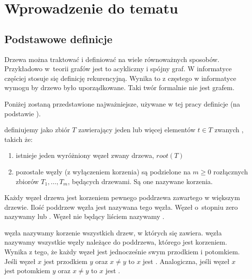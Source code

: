 \chapter{Wprowadzenie do tematu}



\section{Podstawowe definicje}

Drzewa można traktować i definiować na wiele równoważnych sposobów.
Przykładowo w~teorii grafów jest to acykliczny i spójny graf.
W informatyce częściej stosuje się definicję rekurencyjną.
Wynika to z częstego w informatyce wymogu by drzewo było uporządkowane.
Taki twór formalnie nie jest grafem.


Poniżej zostaną przedstawione najważniejsze, używane w tej pracy definicje (na podstawie \cite{knuth}).


  definiujemy jako zbiór $T$ zawierający jeden lub więcej elementów $t \in T$ zwanych  , takich że:

\begin{enumerate}
 \item
    istnieje jeden wyróżniony węzeł zwany  drzewa, $root(T)$
 \item
    pozostałe węzły (z wyłączeniem korzenia) są podzielone na $m \geq 0$ rozłącznych zbiorów $T_{1},\ldots, T_{m}$,
	będących drzewami. Są one nazywane   korzenia.
\end{enumerate}

Każdy węzeł drzewa jest korzeniem pewnego poddrzewa zawartego w większym drzewie.
Ilość poddrzew węzła jest nazywana   tego węzła.
Węzeł o~stopniu zero nazywamy   lub  . 
Węzeł nie będący liściem nazywamy  .



  węzła  nazywamy korzenie wszystkich drzew, w których się zawiera.
  węzła  nazywamy wszystkie węzły należące do poddrzewa, którego jest korzeniem. 
Wynika z tego, że każdy węzeł jest jednocześnie swym przodkiem i potomkiem.
Jeśli węzeł $x$ jest przodkiem $y$ oraz $x \neq y$ to $x$ jest .
Analogiczna, jeśli węzeł $x$ jest potomkiem $y$ oraz $x \neq y$ to $x$ jest .

